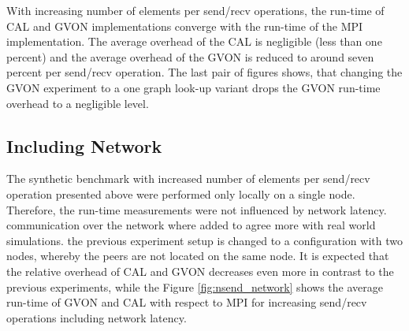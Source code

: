 \noindent With increasing number of elements per send/recv operations,
the run-time of CAL and GVON implementations converge with the
run-time of the MPI implementation. The average overhead of the CAL is
negligible (less than one percent) and the average overhead of the
GVON is reduced to around seven percent per send/recv operation. The
last pair of figures shows, that changing the GVON experiment to a one
graph look-up variant drops the GVON run-time overhead to a negligible
level.

\subsection*{Including Network}
The synthetic benchmark with increased number of elements per
send/recv operation presented above were performed only locally on a
single node.  Therefore, the run-time measurements were not influenced
by network latency. communication over the network where added to
agree more with real world simulations.  the previous experiment setup
is changed to a configuration with two nodes, whereby the peers are
not located on the same node. It is expected that the relative
overhead of CAL and GVON decreases even more in contrast to the
previous experiments, while the Figure \ref{fig:nsend_network} shows
the average run-time of GVON and CAL with respect to MPI for
increasing send/recv operations including network latency.

